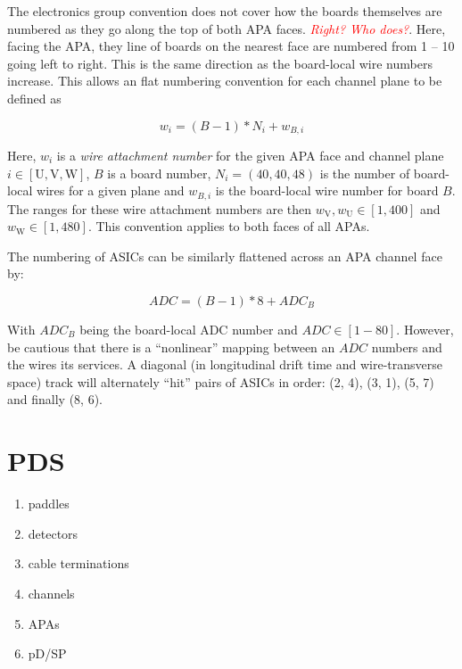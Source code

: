 \documentclass[letterpaper,twoside,onecolumn,article]{memoir}
\newcommand{\fixme}[1]{\textcolor{red}{\textit{#1}}}
\newcommand{\pD}{pD/SP\xspace}
\begin{document}
The electronics group convention does not cover how the boards
themselves are numbered as they go along the top of both APA
faces. \fixme{Right?  Who does?}.  Here, facing the APA, they line of
boards on the nearest face are numbered from 1 -- 10 going left to
right.  This is the same direction as the board-local wire numbers
increase.  This allows an flat numbering convention for each channel
plane to be defined as

\begin{equation}
  \label{eq:wire-attachment-numbers}
  w_{i} = (B-1) * N_{i} + w_{B,i}
\end{equation}

Here, $w_{i}$ is a \textit{wire attachment number} for the given APA
face and channel plane $i \in [\mbox{U}, \mbox{V}, \mbox{W}]$, $B$ is
a board number, $N_{i} = (40, 40, 48)$ is the number of board-local
wires for a given plane and $w_{B,i}$ is the board-local wire number
for board $B$.  The ranges for these wire attachment numbers are then
$w_{\mbox{V}}, w_{\mbox{U}} \in [1, 400]$ and
$w_{\mbox{W}} \in [1, 480]$.  This convention applies to both faces of
all APAs.

The numbering of ASICs can be similarly flattened across an APA
channel face by:

\begin{equation}
  \label{eq:adc-face-numbers}
  ADC = (B-1) * 8 + ADC_{B}
\end{equation}

With $ADC_{B}$ being the board-local ADC number and $ADC \in [1-80]$.
However, be cautious that there is a ``nonlinear'' mapping between an
$ADC$ numbers and the wires its services.  A diagonal (in longitudinal
drift time and wire-transverse space) track will alternately ``hit''
pairs of ASICs in order: (2, 4), (3, 1), (5, 7) and finally (8, 6).



\section{PDS}

\begin{enumerate}
\item paddles
\item detectors
\item cable terminations
\item channels
\item APAs
\item \pD
\end{enumerate}
\end{document}

